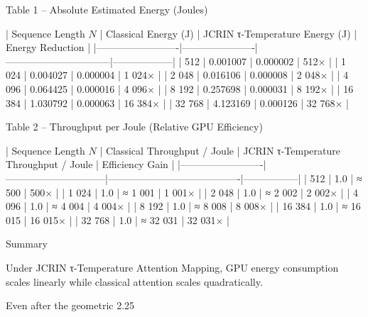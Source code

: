 Table 1 – Absolute Estimated Energy (Joules)

| Sequence Length \( N \) | Classical Energy (J) | JCRIN τ-Temperature Energy (J) | Energy Reduction |
|-------------------------|----------------------|--------------------------------|------------------|
| 512                     | 0.001007             | 0.000002                       | 512×             |
| 1 024                   | 0.004027             | 0.000004                       | 1 024×           |
| 2 048                   | 0.016106             | 0.000008                       | 2 048×           |
| 4 096                   | 0.064425             | 0.000016                       | 4 096×           |
| 8 192                   | 0.257698             | 0.000031                       | 8 192×           |
| 16 384                  | 1.030792             | 0.000063                       | 16 384×          |
| 32 768                  | 4.123169             | 0.000126                       | 32 768×          |

Table 2 – Throughput per Joule (Relative GPU Efficiency)

| Sequence Length \( N \) | Classical Throughput / Joule | JCRIN τ-Temperature Throughput / Joule | Efficiency Gain |
|-------------------------|------------------------------|----------------------------------------|-----------------|
| 512                     | 1.0                          | ≈ 500                                  | 500×        |
| 1 024                   | 1.0                          | ≈ 1 001                                | 1 001×      |
| 2 048                   | 1.0                          | ≈ 2 002                                | 2 002×      |
| 4 096                   | 1.0                          | ≈ 4 004                                | 4 004×      |
| 8 192                   | 1.0                          | ≈ 8 008                                | 8 008×      |
| 16 384                  | 1.0                          | ≈ 16 015                               | 16 015×     |
| 32 768                  | 1.0                          | ≈ 32 031                               | 32 031×     |

Summary

Under JCRIN τ-Temperature Attention Mapping, GPU energy consumption scales linearly while classical attention scales quadratically.  

Even after the geometric 2.25 %
